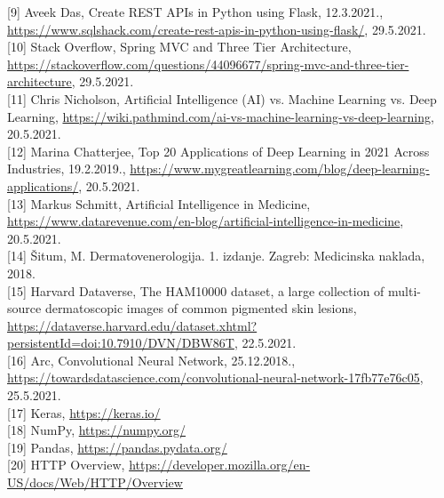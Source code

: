 \documentclass[times, utf8, zavrsni]{fer}
\begin{document}
\noindent{}[9] Aveek Das, Create REST APIs in Python using Flask, 12.3.2021., \url{https://www.sqlshack.com/create-rest-apis-in-python-using-flask/}, 29.5.2021.\\

\noindent{}[10] Stack Overflow, Spring MVC and Three Tier Architecture, \url{https://stackoverflow.com/questions/44096677/spring-mvc-and-three-tier-architecture}, 29.5.2021.\\

\noindent{}[11] Chris Nicholson, Artificial Intelligence (AI) vs. Machine Learning vs. Deep Learning, \url{https://wiki.pathmind.com/ai-vs-machine-learning-vs-deep-learning}, 20.5.2021.\\

\noindent{}[12] Marina Chatterjee, Top 20 Applications of Deep Learning in 2021 Across Industries, 19.2.2019., \url{https://www.mygreatlearning.com/blog/deep-learning-applications/}, 20.5.2021.\\

\noindent{}[13] Markus Schmitt, Artificial Intelligence in Medicine, \url{https://www.datarevenue.com/en-blog/artificial-intelligence-in-medicine}, 20.5.2021.\\

\noindent{}[14] Šitum, M. Dermatovenerologija. 1. izdanje. Zagreb: Medicinska naklada, 2018.\\

\noindent{}[15] Harvard Dataverse, The HAM10000 dataset, a large collection of multi-source dermatoscopic images of common pigmented skin lesions, \url{https://dataverse.harvard.edu/dataset.xhtml?persistentId=doi:10.7910/DVN/DBW86T}, 22.5.2021.\\

\noindent{}[16] Arc, Convolutional Neural Network, 25.12.2018., \url{https://towardsdatascience.com/convolutional-neural-network-17fb77e76c05}, 25.5.2021.\\

\noindent{}[17] Keras, \url{https://keras.io/}\\

\noindent{}[18] NumPy, \url{https://numpy.org/}\\

\noindent{}[19] Pandas, \url{https://pandas.pydata.org/}\\

\noindent{}[20] HTTP Overview, \url{https://developer.mozilla.org/en-US/docs/Web/HTTP/Overview}\\
\end{document}
